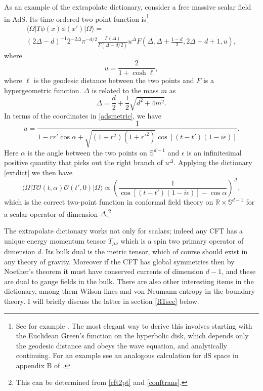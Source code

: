 \documentclass[12pt]{article}
\newcommand{\be}{\begin{equation}}
\newcommand{\ee}{\end{equation}}
\newcommand{\lan}{\langle}
\newcommand{\ran}{\rangle}
\begin{document}
As an example of the extrapolate dictionary, consider a free massive scalar field in AdS.  Its time-ordered two point function is\footnote{See for example \cite{Burgess:1984ti}.  The most elegant way to derive this involves starting with the Euclidean Green's function on the hyperbolic disk, which depends only the geodesic distance and obeys the wave equation, and analytically continuing.  For an example see an analogous calculation for dS space in appendix B of \cite{Harlow:2011ke}.}
\begin{multline}
\lan\Omega|T\phi(x)\phi(x')|\Omega\ran= \\(2\Delta-d)^{-1}2^{-2\Delta}\pi^{-d/2}\frac{\Gamma(\Delta)}{\Gamma(\Delta-d/2)} u^\Delta F\left(\Delta, \Delta+\frac{1-d}{2},2\Delta-d+1,u\right),
\end{multline}
where 
\be
u=\frac{2}{1+\cosh\ell},
\ee
where $\ell$ is the geodesic distance between the two points and $F$ is a hypergeometric function.  $\Delta$ is related to the mass $m$ as
\be\label{Deltaeq}
\Delta=\frac{d}{2}+\frac{1}{2}\sqrt{d^2+4m^2}.
\ee
In terms of the coordinates in \eqref{adsmetric}, we have
\be
u=\frac{1}{1-r r' \cos\alpha+\sqrt{(1+r^2)(1+r'^2)}\cos\left[\left(t-t'\right)(1-i \epsilon)\right]}.
\ee
Here $\alpha$ is the angle between the two points on $\mathbb{S}^{d-1}$ and $\epsilon$ is an infinitesimal positive quantity that picks out the right branch of $u^{\Delta}$.  Applying the dictionary \eqref{extdict} we then have
\be\label{sphere2pt}
\lan\Omega| T\mathcal{O}(t,\alpha)\mathcal{O}(t',0)|\Omega\ran\propto \left(\frac{1}{\cos\left[\left(t-t'\right)(1-i \epsilon)\right]-\cos\alpha}\right)^\Delta,
\ee
which is the correct two-point function in conformal field theory on $\mathbb{R}\times \mathbb{S}^{d-1}$ for a scalar operator of dimension $\Delta$.\footnote{This can be determined from \eqref{cft2pt} and \eqref{conftrans}.}

The extrapolate dictionary works not only for scalars; indeed any CFT has a unique energy momentum tensor $T_{\mu\nu}$ which is a spin two primary operator of dimension $d$.  Its bulk dual is the metric tensor, which of course should exist in any theory of gravity.  Moreover if the CFT has global symmetries then by Noether's theorem it must have conserved currents of dimension $d-1$, and these are dual to gauge fields in the bulk.  There are also other interesting items in the dictionary, among them Wilson lines \cite{Maldacena:1998im} and von Neumann entropy \cite{Ryu:2006bv,Hubeny:2007xt,Nishioka:2009un,Lewkowycz:2013nqa} in the boundary theory.  I will briefly discuss the latter in section \ref{RTsec} below.
\end{document}
